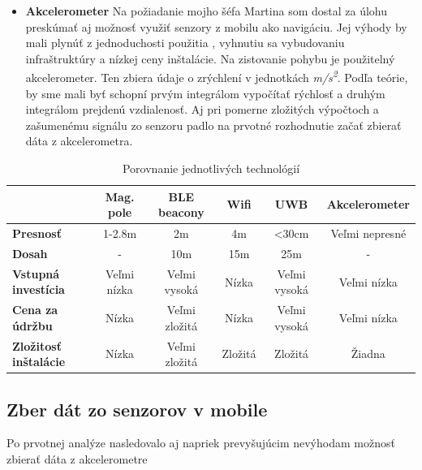 \documentclass[11pt, oneside]{report}
\begin{document}
\begin{itemize}
\item\textbf{Akcelerometer} Na požiadanie mojho šéfa Martina som dostal za úlohu preskúmať  aj  možnosť využiť   senzory z mobilu ako navigáciu. Jej výhody by mali plynúť z jednoduchosti použitia , vyhnutiu sa vybudovaniu infraštruktúry  a nízkej ceny inštalácie. Na zistovanie pohybu   je použitelný  akcelerometer. Ten zbiera údaje o zrýchlení v jednotkách \textit{m/s\textsuperscript{2}}. Podľa teórie, by sme mali byť schopní prvým integrálom vypočítať rýchlosť a druhým integrálom prejdenú vzdialenosť. Aj pri pomerne zložitých výpočtoch a zašumenému signálu zo senzoru padlo na prvotné rozhodnutie  začať zbierať dáta z akcelerometra.
\end{itemize}

\begin{table}
\centering
\label{tab}
\begin{tabular}{|l|c|c|c|c|c|}
\hline
                              & \textbf{Mag. pole} & \textbf{BLE beacony} & \textbf{Wifi} & \textbf{UWB}  & \textbf{Akcelerometer} \\ \hline
\textbf{Presnosť}             & 1-2.8m                        & 2m                         & 4m            & \textless30cm & Veľmi nepresné            \\ \hline
\textbf{Dosah}                & -                             & 10m                        & 15m           & 25m           & -                         \\ \hline
\textbf{Vstupná investícia}   & Veľmi nízka                   & Veľmi vysoká               & Nízka         & Veľmi vysoká  & Veľmi nízka               \\ \hline
\textbf{Cena za údržbu}       & Nízka                         & Veľmi zložitá              & Nízka         & Veľmi vysoká  & Veľmi nízka               \\ \hline
\textbf{Zložitosť inštalácie} & Nízka                         & Veľmi zložitá              & Zložitá       & Zložitá       & Žiadna                    \\ \hline
\end{tabular}
\caption{Porovnanie  jednotlivých technológií}
\end{table}

\subsection{Zber dát zo senzorov  v mobile}
Po  prvotnej analýze nasledovalo aj napriek prevyšujúcim nevýhodam možnosť zbierať dáta z akcelerometre
\end{document}
